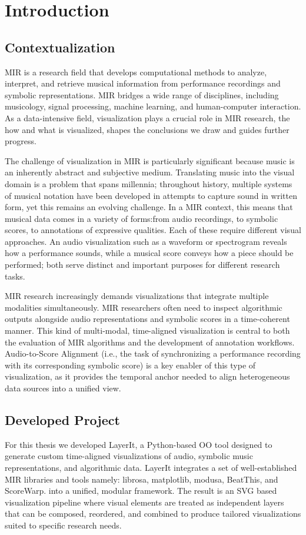 \chapter{Introduction} \label{chap:intro}

\section{Contextualization} \label{sec:context}
\ac{MIR} is a research field that develops computational methods to analyze, interpret, and retrieve musical information from performance recordings and symbolic representations. \ac{MIR} bridges a wide range of disciplines, including musicology, signal processing, machine learning, and human-computer interaction. As a data-intensive field, visualization plays a crucial role in \ac{MIR} research, the how and what is visualized, shapes the conclusions we draw and guides further progress.

The challenge of visualization in MIR is particularly significant because music is an inherently abstract and subjective medium. Translating music into the visual domain is a problem that spans millennia; throughout history, multiple systems of musical notation have been developed in attempts to capture sound in written form, yet this remains an evolving challenge. In a MIR context, this means that musical data comes in a variety of forms:from audio recordings, to symbolic scores, to annotations of expressive qualities. Each of these require different visual approaches. An audio visualization such as a waveform or spectrogram reveals how a performance sounds, while a musical score conveys how a piece should be performed; both serve distinct and important purposes for different research tasks.

MIR research increasingly demands visualizations that integrate multiple modalities simultaneously. MIR researchers often need to inspect algorithmic outputs alongside audio representations and symbolic scores in a time-coherent manner. This kind of multi-modal, time-aligned visualization is central to both the evaluation of MIR algorithms and the development of annotation workflows. Audio-to-Score Alignment (i.e., the task of synchronizing a performance recording with its corresponding symbolic score) is a key enabler of this type of visualization, as it provides the temporal anchor needed to align heterogeneous data sources into a unified view.

\section{Developed Project} \label{sec:proj}
For this thesis we developed LayerIt, a Python-based \ac{OO} tool designed to generate custom time-aligned visualizations of audio, symbolic music representations, and algorithmic data. LayerIt integrates a set of well-established \ac{MIR} libraries and tools namely: librosa, matplotlib, modusa, BeatThis, and ScoreWarp. into a unified, modular framework. The result is an \ac{SVG} based visualization pipeline where visual elements are treated as independent layers that can be composed, reordered, and combined to produce tailored visualizations suited to specific research needs.

